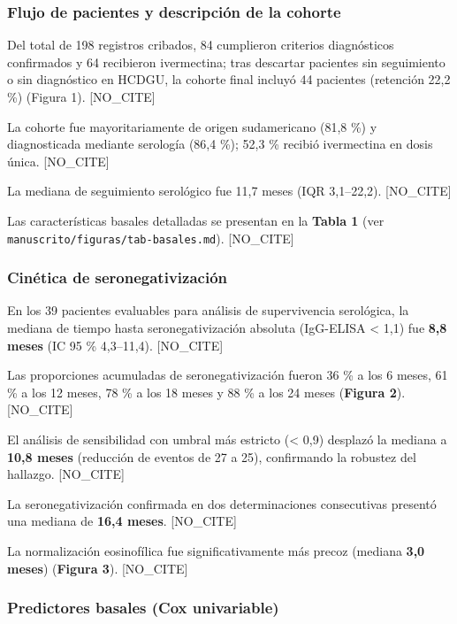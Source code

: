 \documentclass[
  spanish,
  12pt,
  a4paper,
]{article}
\begin{document}
\subsubsection{Flujo de pacientes y descripción de la
cohorte}\label{flujo-de-pacientes-y-descripciuxf3n-de-la-cohorte}

Del total de 198 registros cribados, 84 cumplieron criterios
diagnósticos confirmados y 64 recibieron ivermectina; tras descartar
pacientes sin seguimiento o sin diagnóstico en HCDGU, la cohorte final
incluyó 44 pacientes (retención 22,2 \%) (Figura 1). {[}NO\_CITE{]}

La cohorte fue mayoritariamente de origen sudamericano (81,8 \%) y
diagnosticada mediante serología (86,4 \%); 52,3 \% recibió ivermectina
en dosis única. {[}NO\_CITE{]}

La mediana de seguimiento serológico fue 11,7 meses (IQR 3,1--22,2).
{[}NO\_CITE{]}

Las características basales detalladas se presentan en la \textbf{Tabla
1} (ver \texttt{manuscrito/figuras/tab-basales.md}). {[}NO\_CITE{]}

\subsubsection{Cinética de
seronegativización}\label{cinuxe9tica-de-seronegativizaciuxf3n}

En los 39 pacientes evaluables para análisis de supervivencia
serológica, la mediana de tiempo hasta seronegativización absoluta
(IgG-ELISA \textless{} 1,1) fue \textbf{8,8 meses} (IC 95 \% 4,3--11,4).
{[}NO\_CITE{]}

Las proporciones acumuladas de seronegativización fueron 36 \% a los 6
meses, 61 \% a los 12 meses, 78 \% a los 18 meses y 88 \% a los 24 meses
(\textbf{Figura 2}). {[}NO\_CITE{]}

El análisis de sensibilidad con umbral más estricto (\textless{} 0,9)
desplazó la mediana a \textbf{10,8 meses} (reducción de eventos de 27 a
25), confirmando la robustez del hallazgo. {[}NO\_CITE{]}

La seronegativización confirmada en dos determinaciones consecutivas
presentó una mediana de \textbf{16,4 meses}. {[}NO\_CITE{]}

La normalización eosinofílica fue significativamente más precoz (mediana
\textbf{3,0 meses}) (\textbf{Figura 3}). {[}NO\_CITE{]}

\subsubsection{Predictores basales (Cox
univariable)}\label{predictores-basales-cox-univariable}
\end{document}
